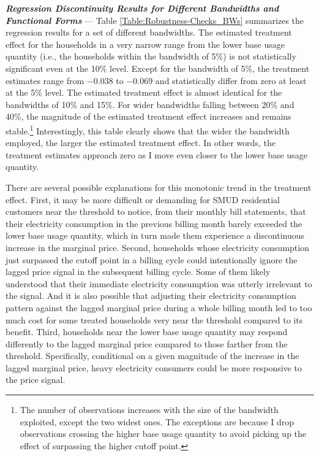 \noindent
\textit{\textbf{Regression Discontinuity Results for Different Bandwidths and Functional Forms}} --- 
Table \ref{Table:Robustness-Checks_BWs} summarizes the regression results for a set of different bandwidths. The estimated treatment effect for the households in a very narrow range from the lower base usage quantity (i.e., the households within the bandwidth of 5\%) is not statistically significant even at the 10\% level. Except for the bandwidth of 5\%, the treatment estimates range from $-$0.038 to $-$0.069 and statistically differ from zero at least at the 5\% level. The estimated treatment effect is almost identical for the bandwidths of 10\% and 15\%. For wider bandwidths falling between 20\% and 40\%, the magnitude of the estimated treatment effect increases and remains stable.\footnote{The number of observations increases with the size of the bandwidth exploited, except the two widest ones. The exceptions are because I drop observations crossing the higher base usage quantity to avoid picking up the effect of surpassing the higher cutoff point.} Interestingly, this table clearly shows that the wider the bandwidth employed, the larger the estimated treatment effect. In other words, the treatment estimates approach zero as I move even closer to the lower base usage quantity.

There are several possible explanations for this monotonic trend in the treatment effect. First, it may be more difficult or demanding for SMUD residential customers near the threshold to notice, from their monthly bill statements, that their electricity consumption in the previous billing month barely exceeded the lower base usage quantity, which in turn made them experience a discontinuous increase in the marginal price. Second, households whose electricity consumption just surpassed the cutoff point in a billing cycle could intentionally ignore the lagged price signal in the subsequent billing cycle. Some of them likely understood that their immediate electricity consumption was utterly irrelevant to the signal. And it is also possible that adjusting their electricity consumption pattern against the lagged marginal price during a whole billing month led to too much cost for some treated households very near the threshold compared to its benefit. Third, households near the lower base usage quantity may respond differently to the lagged marginal price compared to those farther from the threshold. Specifically, conditional on a given magnitude of the increase in the lagged marginal price, heavy electricity consumers could be more responsive to the price signal. 

